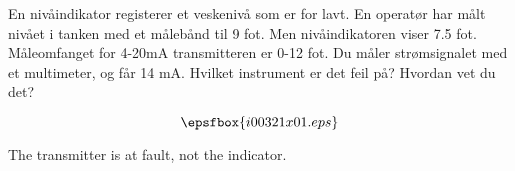 


En niv{\aa}indikator registerer et veskeniv{\aa} som er for lavt. En operat{\o}r har m{\aa}lt niv{\aa}et i tanken med et m{\aa}leb{\aa}nd til 9 fot. Men niv{\aa}indikatoren viser 7.5 fot. M{\aa}leomfanget for 4-20mA transmitteren er 0-12 fot. Du m{\aa}ler str{\o}msignalet med et multimeter, og f{\aa}r 14 mA. Hvilket instrument er det feil p{\aa}? Hvordan vet du det?

$$\epsfbox{i00321x01.eps}$$







The transmitter is at fault, not the indicator.











